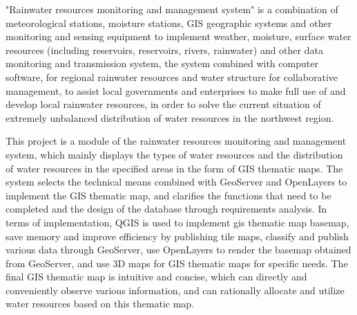 "Rainwater resources monitoring and management system" is a combination of meteorological stations, moisture stations, GIS geographic systems and other monitoring and sensing equipment to implement weather, moisture, surface water resources (including reservoirs, reservoirs, rivers, rainwater) and other data monitoring and transmission system, the system combined with computer software, for regional rainwater resources and water structure for collaborative management, to assist local governments and enterprises to make full use of and develop local rainwater resources, in order to solve the current situation of extremely unbalanced distribution of water resources in the northwest region.

This project is a module of the rainwater resources monitoring and management system, which mainly displays the types of water resources and the distribution of water resources in the specified areas in the form of GIS thematic maps. The system selects the technical means combined with GeoServer and OpenLayers to implement the GIS thematic map, and clarifies the functions that need to be completed and the design of the database through requirements analysis. In terms of implementation, QGIS is used to implement gis thematic map basemap, save memory and improve efficiency by publishing tile maps, classify and publish various data through GeoServer, use OpenLayers to render the basemap obtained from GeoServer, and use 3D maps for GIS thematic maps for specific needs. The final GIS thematic map is intuitive and concise, which can directly and conveniently observe various information, and can rationally allocate and utilize water resources based on this thematic map.